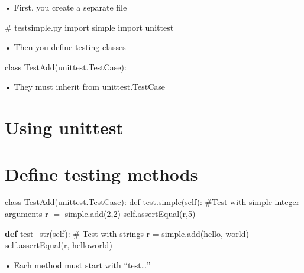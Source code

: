 \documentclass[
  letterpaper,
  DIV=11,
  numbers=noendperiod]{scrreprt}
\newenvironment{Shaded}{\begin{snugshade}}{\end{snugshade}}
\newcommand{\CommentTok}[1]{\textcolor[rgb]{0.37,0.37,0.37}{#1}}
\newcommand{\ImportTok}[1]{\textcolor[rgb]{0.00,0.46,0.62}{#1}}
\newcommand{\KeywordTok}[1]{\textcolor[rgb]{0.00,0.23,0.31}{\textbf{#1}}}
\newcommand{\NormalTok}[1]{\textcolor[rgb]{0.00,0.23,0.31}{#1}}
\newcommand{\OperatorTok}[1]{\textcolor[rgb]{0.37,0.37,0.37}{#1}}
\newcommand{\StringTok}[1]{\textcolor[rgb]{0.13,0.47,0.30}{#1}}
\newcommand{\VariableTok}[1]{\textcolor[rgb]{0.07,0.07,0.07}{#1}}
\begin{document}
• First, you create a separate file

\begin{Shaded}
\begin{Highlighting}[]
\CommentTok{\# testsimple.py}
\ImportTok{import}\NormalTok{ simple}
\ImportTok{import}\NormalTok{ unittest }
\end{Highlighting}
\end{Shaded}

• Then you define testing classes

\begin{Shaded}
\begin{Highlighting}[]
\NormalTok{class TestAdd(unittest.TestCase): }
\end{Highlighting}
\end{Shaded}

• They must inherit from unittest.TestCase


\chapter{Using unittest}\label{using-unittest-1}


\chapter{Define testing methods}\label{define-testing-methods}

class TestAdd(unittest.TestCase): def test.simple(self): \#Test with
simple integer arguments r \(=\) simple.add(2,2) self.assertEqual(r,5)

\begin{Shaded}
\begin{Highlighting}[]
\KeywordTok{def}\NormalTok{ test\_str(}\VariableTok{self}\NormalTok{):}
    \CommentTok{\# Test with strings}
\NormalTok{    r }\OperatorTok{=}\NormalTok{ simple.add(}\StringTok{\textquotesingle{}hello\textquotesingle{}}\NormalTok{, }\StringTok{\textquotesingle{}world\textquotesingle{}}\NormalTok{)}
    \VariableTok{self}\NormalTok{.assertEqual(r, }\StringTok{\textquotesingle{}helloworld\textquotesingle{}}\NormalTok{) }
\end{Highlighting}
\end{Shaded}

• Each method must start with ``test\ldots{}''

\end{document}
